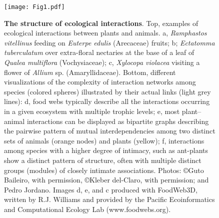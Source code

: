 \documentclass[10pt,letterpaper]{article}
\begin{document}
\begin{figure}[h]
\begin{adjustwidth}{-2.25in}{0in}
\caption{\textbf{The structure of ecological interactions}. Top, examples of ecological interactions between plants and animals. a, \textit{Ramphastos vitellinus} feeding on \textit{Euterpe edulis} (Arecaceae) fruits; b; \textit{Ectatomma tuberculatum} over extra-floral nectaries at the base of a leaf of \textit{Qualea multiflora} (Vochysiaceae); c, \textit{Xylocopa violacea} visiting a flower of \textit{Allium} sp. (Amaryllidaceae). Bottom, different visualizations of the complexity of interaction networks among species (colored spheres) illustrated by their actual links (light grey lines): d, food webs typically describe all the interactions occurring in a given ecosystem with multiple trophic levels; e, most plant–animal interactions can be displayed as bipartite graphs describing the pairwise pattern of mutual interdependencies among two distinct sets of animals (orange nodes) and plants (yellow); f, interactions among species with a higher degree of intimacy, such as ant-plants show a distinct pattern of structure, often with multiple distinct groups (modules) of closely intimate associations. Photos: \copyright Guto Baileiro, with permission, \copyright Kleber del-Claro, with permission; and Pedro Jordano. Images d, e, and c produced with FoodWeb3D, written by R.J. Williams and provided by the Pacific Ecoinformatics and Computational Ecology Lab (www.foodwebs.org).}
\label{fig1}
  \begin{center}
    \texttt{[image: Fig1.pdf]}
  \end{center}
\end{adjustwidth}
\end{figure}
\end{document}
